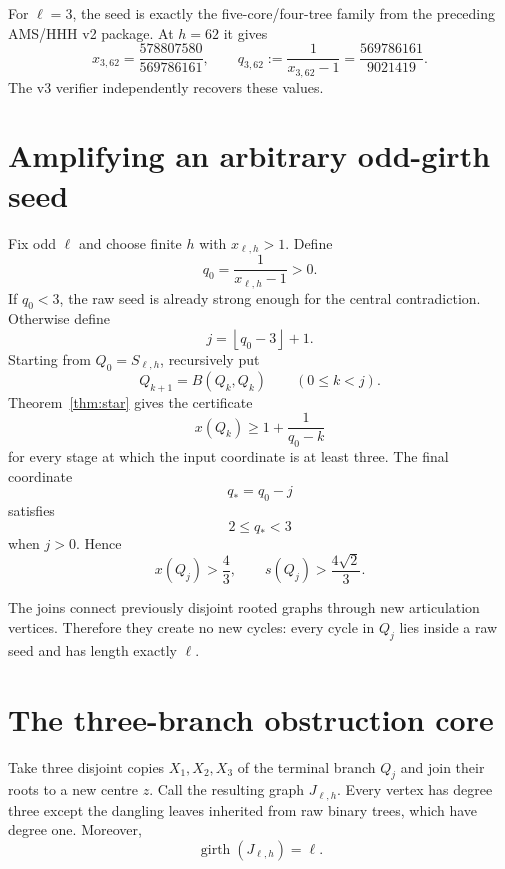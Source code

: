 \documentclass[11pt]{article}
\begin{document}
For $\ell=3$, the seed is exactly the five-core/four-tree family from the preceding AMS/HHH v2 package.  At $h=62$ it gives
\begin{equation}\label{eq:v2seed}
 x_{3,62}=\frac{578807580}{569786161},\qquad
 q_{3,62}:=\frac1{x_{3,62}-1}
 =\frac{569786161}{9021419}.
\end{equation}
The v3 verifier independently recovers these values.

\section{Amplifying an arbitrary odd-girth seed}

Fix odd $\ell$ and choose finite $h$ with $x_{\ell,h}>1$.  Define
\begin{equation}\label{eq:q0}
 q_0=\frac1{x_{\ell,h}-1}>0.
\end{equation}
If $q_0<3$, the raw seed is already strong enough for the central contradiction.  Otherwise define
\begin{equation}\label{eq:j}
 j=\left\lfloor q_0-3\right\rfloor+1.
\end{equation}
Starting from $Q_0=S_{\ell,h}$, recursively put
\begin{equation}\label{eq:Qrec}
 Q_{k+1}=B(Q_k,Q_k)\qquad(0\le k<j).
\end{equation}
Theorem~\ref{thm:star} gives the certificate
\begin{equation}\label{eq:qspend}
 x(Q_k)\ge1+\frac1{q_0-k}
\end{equation}
for every stage at which the input coordinate is at least three.  The final coordinate
\[
 q_*=q_0-j
\]
satisfies
\begin{equation}\label{eq:qrange}
 2\le q_*<3
\end{equation}
when $j>0$.  Hence
\begin{equation}\label{eq:strongbranch}
 x(Q_j)>\frac43,
 \qquad
 s(Q_j)>\frac{4\sqrt2}{3}.
\end{equation}

The joins connect previously disjoint rooted graphs through new articulation vertices.  Therefore they create no new cycles: every cycle in $Q_j$ lies inside a raw seed and has length exactly $\ell$.

\section{The three-branch obstruction core}

Take three disjoint copies $X_1,X_2,X_3$ of the terminal branch $Q_j$ and join their roots to a new centre $z$.  Call the resulting graph $J_{\ell,h}$.  Every vertex has degree three except the dangling leaves inherited from raw binary trees, which have degree one.  Moreover,
\begin{equation}\label{eq:coregirth}
 \operatorname{girth}(J_{\ell,h})=\ell.
\end{equation}
\end{document}

